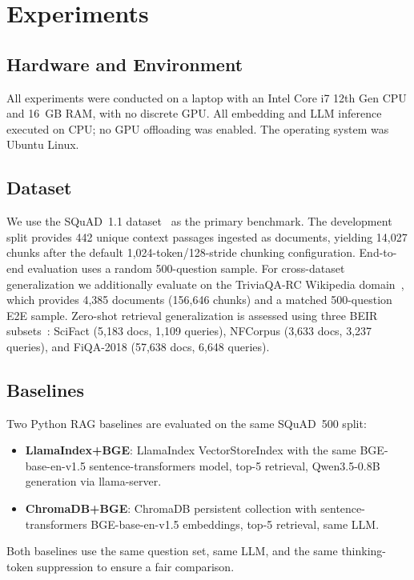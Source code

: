 \documentclass[conference]{IEEEtran}
\begin{document}
\section{Experiments}

\subsection{Hardware and Environment}
All experiments were conducted on a laptop with an Intel Core i7 12th Gen
CPU and 16~GB RAM, with no discrete GPU. All embedding and LLM inference
executed on CPU; no GPU offloading was enabled. The operating system was
Ubuntu Linux.

\subsection{Dataset}
We use the SQuAD~1.1 dataset~\cite{b10} as the primary benchmark. The
development split provides 442 unique context passages ingested as documents,
yielding 14{,}027 chunks after the default 1{,}024-token/128-stride chunking
configuration. End-to-end evaluation uses a random 500-question sample. For
cross-dataset generalization we additionally evaluate on the TriviaQA-RC
Wikipedia domain~\cite{b29}, which provides 4{,}385 documents (156{,}646
chunks) and a matched 500-question E2E sample. Zero-shot retrieval
generalization is assessed using three BEIR subsets~\cite{b23}: SciFact
(5{,}183 docs, 1{,}109 queries), NFCorpus (3{,}633 docs, 3{,}237 queries),
and FiQA-2018 (57{,}638 docs, 6{,}648 queries).

\subsection{Baselines}
Two Python RAG baselines are evaluated on the same SQuAD~500 split:
\begin{itemize}
  \item \textbf{LlamaIndex+BGE}: LlamaIndex VectorStoreIndex with the same
        BGE-base-en-v1.5 sentence-transformers model, top-5 retrieval, Qwen3.5-0.8B
        generation via llama-server.
  \item \textbf{ChromaDB+BGE}: ChromaDB persistent collection with
        sentence-transformers BGE-base-en-v1.5 embeddings, top-5 retrieval,
        same LLM.
\end{itemize}
Both baselines use the same question set, same LLM, and the same
thinking-token suppression to ensure a fair comparison.
\end{document}
